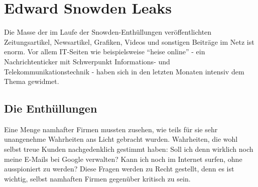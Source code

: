 \newpage
\section{Edward Snowden Leaks}
Die Masse der im Laufe der Snowden-Enthüllungen veröffentlichten Zeitungsartikel, Newsartikel, Grafiken, Videos und sonstigen Beiträge im Netz ist enorm.
Vor allem IT-Seiten wie beispielsweise ``heise online'' - ein Nachrichtenticker mit Schwerpunkt Informations- und Telekommunikationstechnik - haben sich in den letzten Monaten intensiv dem Thema gewidmet.

\subsection{Die Enthüllungen}
Eine Menge namhafter Firmen mussten zusehen, wie teils für sie sehr unangenehme Wahrheiten ans Licht gebracht wurden. Wahrheiten, die wohl selbst treue Kunden nachgedenklich gestimmt haben: Soll ich denn wirklich noch meine E-Mails bei Google verwalten? Kann ich noch im Internet surfen, ohne ausspioniert zu werden? Diese Fragen werden zu Recht gestellt, denn es ist wichtig, selbst namhaften Firmen gegenüber kritisch zu sein.

